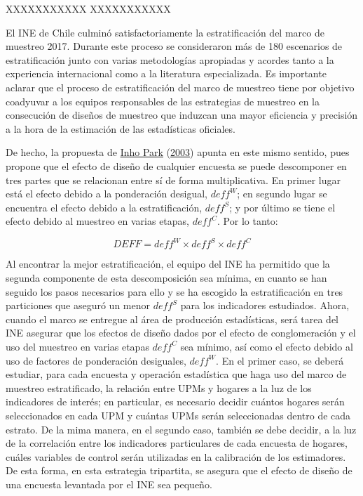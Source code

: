 \documentclass[
  12pt,
  spanish,
]{book}
\begin{document}
\normalsize

XXXXXXXXXXX
XXXXXXXXXXX

El INE de Chile culminó satisfactoriamente la estratificación del marco de muestreo 2017. Durante este proceso se consideraron más de 180 escenarios de estratificación junto con varias metodologías apropiadas y acordes tanto a la experiencia internacional como a la literatura especializada. Es importante aclarar que el proceso de estratificación del marco de muestreo tiene por objetivo coadyuvar a los equipos responsables de las estrategias de muestreo en la consecución de diseños de muestreo que induzcan una mayor eficiencia y precisión a la hora de la estimación de las estadísticas oficiales.

De hecho, la propuesta de \protect\hyperlink{ref-Park_2003}{Inho Park} (\protect\hyperlink{ref-Park_2003}{2003}) apunta en este mismo sentido, pues propone que el efecto de diseño de cualquier encuesta se puede descomponer en tres partes que se relacionan entre sí de forma multiplicativa. En primer lugar está el efecto debido a la ponderación desigual, \(deff^W\); en segundo lugar se encuentra el efecto debido a la estratificación, \(deff^S\); y por último se tiene el efecto debido al muestreo en varias etapas, \(deff^C\). Por lo tanto:

\[
DEFF = deff^W \times deff^S \times deff^C
\]

Al encontrar la mejor estratificación, el equipo del INE ha permitido que la segunda componente de esta descomposición sea mínima, en cuanto se han seguido los pasos necesarios para ello y se ha escogido la estratificación en tres particiones que aseguró un menor \(deff^S\) para los indicadores estudiados. Ahora, cuando el marco se entregue al área de producción estadísticas, será tarea del INE asegurar que los efectos de diseño dados por el efecto de conglomeración y el uso del muestreo en varias etapas \(deff^C\) sea mínimo, así como el efecto debido al uso de factores de ponderación desiguales, \(deff^W\). En el primer caso, se deberá estudiar, para cada encuesta y operación estadística que haga uso del marco de muestreo estratificado, la relación entre UPMs y hogares a la luz de los indicadores de interés; en particular, es necesario decidir cuántos hogares serán seleccionados en cada UPM y cuántas UPMs serán seleccionadas dentro de cada estrato. De la mima manera, en el segundo caso, también se debe decidir, a la luz de la correlación entre los indicadores particulares de cada encuesta de hogares, cuáles variables de control serán utilizadas en la calibración de los estimadores. De esta forma, en esta estrategia tripartita, se asegura que el efecto de diseño de una encuesta levantada por el INE sea pequeño.
\end{document}
